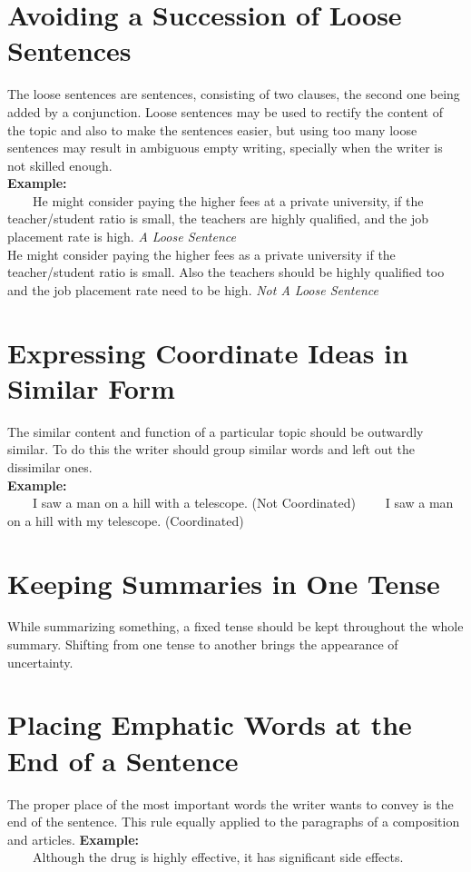\documentclass[12pt]{report}
\newcommand{\xmpl}{\textbf{Example:}\\} %
\newcommand{\indnt}{\ \ \ \ } %
\begin{document}
\section{Avoiding a Succession of Loose Sentences}
The loose sentences are sentences, consisting of two clauses, the second one being added by a conjunction. Loose sentences may be used to rectify the content of the topic and also to make the sentences easier, but using too many loose sentences may result in ambiguous empty writing, specially when the writer is not skilled enough.\\
\xmpl
\indnt He might consider paying the higher fees at a private university, if the teacher/student ratio is small, the teachers are highly qualified, and the job placement rate is high. \textit{A Loose Sentence}\\
He might consider paying the higher fees as a private university if the teacher/student ratio is small. Also the teachers should be highly qualified too and the job placement rate need to be high. \textit{Not A Loose Sentence}\\
\section{Expressing Coordinate Ideas in Similar Form}
The similar content and function of a particular topic should be outwardly similar. To do this the writer should group similar words and left out the dissimilar ones.\\
\xmpl
\indnt I saw a man on a hill with a telescope. (Not Coordinated)
\indnt I saw a man on a hill with my telescope. (Coordinated)\\
\section{Keeping Summaries in One Tense}
While summarizing something, a fixed tense should be kept throughout the whole summary. Shifting from one tense to another brings the appearance of uncertainty.

\section{Placing Emphatic Words at the End of a Sentence}
The proper place of the most important words the writer wants to convey is the end of the sentence. This rule equally applied to the paragraphs of a composition and articles.
\xmpl
\indnt Although the drug is highly effective, it has significant side effects.
\end{document}

